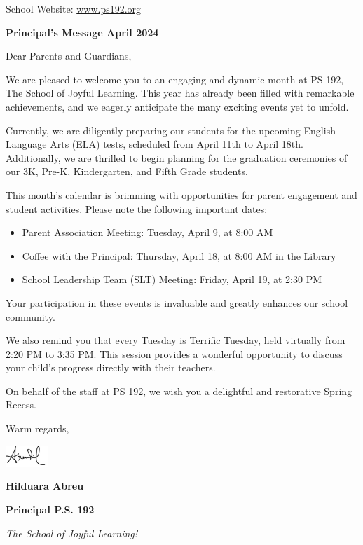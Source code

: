 \documentclass[12pt,letterpaper]{article}
\begin{document}
\vspace*{0.5in}
School Website: \href{https://www.ps192.org}{www.ps192.org}

\textbf{Principal's Message April 2024}

Dear Parents and Guardians,
 
We are pleased to welcome you to an engaging and dynamic month at PS 192, The School of Joyful Learning. This year has already been filled with remarkable achievements, and we eagerly anticipate the many exciting events yet to unfold.
 
Currently, we are diligently preparing our students for the upcoming English Language Arts (ELA) tests, scheduled from April 11th to April 18th. Additionally, we are thrilled to begin planning for the graduation ceremonies of our 3K, Pre-K, Kindergarten, and Fifth Grade students.
 
This month’s calendar is brimming with opportunities for parent engagement and student activities. Please note the following important dates:

\begin{itemize}
\item Parent Association Meeting: Tuesday, April 9, at 8:00 AM
\item Coffee with the Principal: Thursday, April 18, at 8:00 AM in the Library
\item School Leadership Team (SLT) Meeting: Friday, April 19, at 2:30 PM
\end{itemize}

Your participation in these events is invaluable and greatly enhances our school community.

We also remind you that every Tuesday is Terrific Tuesday, held virtually from 2:20 PM to 3:35 PM. This session provides a wonderful opportunity to discuss your child’s progress directly with their teachers.
 
On behalf of the staff at PS 192, we wish you a delightful and restorative Spring Recess.
 
Warm regards,

\includegraphics[width=0.12\textwidth]{hil_signature}

\textbf{Hilduara Abreu}

\textbf{Principal P.S. 192}

\textit{The School of Joyful Learning!}
\end{document}
